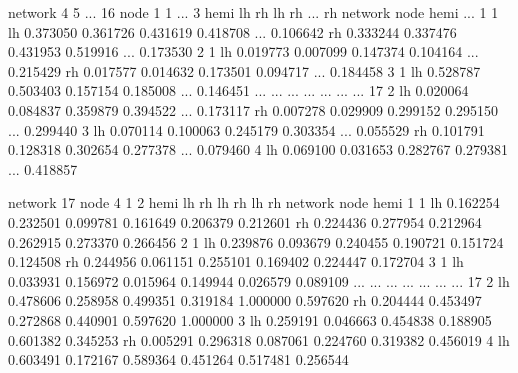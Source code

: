 \documentclass[letterpaper,10pt,english]{jupyterBook}
\begin{document}
\begin{sphinxVerbatim}[commandchars=\\\{\}]
network                   4                   5            ...        16  \PYGZbs{}
node                      1                   1            ...         3   
hemi                     lh        rh        lh        rh  ...        rh   
network node hemi                                          ...             
1       1    lh   \PYGZhy{}0.373050 \PYGZhy{}0.361726  0.431619  0.418708  ... \PYGZhy{}0.106642   
             rh   \PYGZhy{}0.333244 \PYGZhy{}0.337476  0.431953  0.519916  ... \PYGZhy{}0.173530   
2       1    lh   \PYGZhy{}0.019773  0.007099 \PYGZhy{}0.147374 \PYGZhy{}0.104164  ... \PYGZhy{}0.215429   
             rh   \PYGZhy{}0.017577 \PYGZhy{}0.014632 \PYGZhy{}0.173501 \PYGZhy{}0.094717  ... \PYGZhy{}0.184458   
3       1    lh    0.528787  0.503403 \PYGZhy{}0.157154 \PYGZhy{}0.185008  ... \PYGZhy{}0.146451   
...                     ...       ...       ...       ...  ...       ...   
17      2    lh    0.020064  0.084837 \PYGZhy{}0.359879 \PYGZhy{}0.394522  ...  0.173117   
             rh    0.007278  0.029909 \PYGZhy{}0.299152 \PYGZhy{}0.295150  ...  0.299440   
        3    lh    0.070114  0.100063 \PYGZhy{}0.245179 \PYGZhy{}0.303354  ... \PYGZhy{}0.055529   
             rh    0.101791  0.128318 \PYGZhy{}0.302654 \PYGZhy{}0.277378  ...  0.079460   
        4    lh   \PYGZhy{}0.069100 \PYGZhy{}0.031653 \PYGZhy{}0.282767 \PYGZhy{}0.279381  ...  0.418857   

network                                      17                                \PYGZbs{}
node                      4                   1                   2             
hemi                     lh        rh        lh        rh        lh        rh   
network node hemi                                                               
1       1    lh   \PYGZhy{}0.162254 \PYGZhy{}0.232501 \PYGZhy{}0.099781 \PYGZhy{}0.161649 \PYGZhy{}0.206379 \PYGZhy{}0.212601   
             rh   \PYGZhy{}0.224436 \PYGZhy{}0.277954 \PYGZhy{}0.212964 \PYGZhy{}0.262915 \PYGZhy{}0.273370 \PYGZhy{}0.266456   
2       1    lh   \PYGZhy{}0.239876 \PYGZhy{}0.093679 \PYGZhy{}0.240455 \PYGZhy{}0.190721 \PYGZhy{}0.151724 \PYGZhy{}0.124508   
             rh   \PYGZhy{}0.244956 \PYGZhy{}0.061151 \PYGZhy{}0.255101 \PYGZhy{}0.169402 \PYGZhy{}0.224447 \PYGZhy{}0.172704   
3       1    lh   \PYGZhy{}0.033931 \PYGZhy{}0.156972 \PYGZhy{}0.015964 \PYGZhy{}0.149944  0.026579 \PYGZhy{}0.089109   
...                     ...       ...       ...       ...       ...       ...   
17      2    lh    0.478606  0.258958  0.499351  0.319184  1.000000  0.597620   
             rh    0.204444  0.453497  0.272868  0.440901  0.597620  1.000000   
        3    lh    0.259191  0.046663  0.454838  0.188905  0.601382  0.345253   
             rh    0.005291  0.296318  0.087061  0.224760  0.319382  0.456019   
        4    lh    0.603491  0.172167  0.589364  0.451264  0.517481  0.256544   


\end{sphinxVerbatim}
\end{document}
